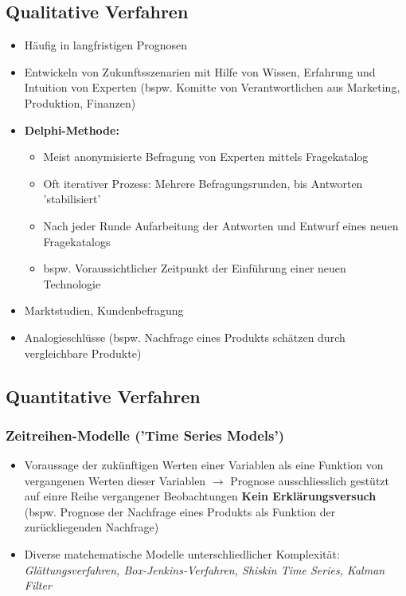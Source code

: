 \documentclass{report}
\theoremstyle{definition}
\theoremstyle{example}
\begin{document}
   \subsection{Qualitative Verfahren}

\begin{itemize}
   \item Häufig in langfristigen Prognosen
   \item Entwickeln von Zukunftsszenarien mit Hilfe von Wissen, Erfahrung und Intuition von Experten (bspw. Komitte von Verantwortlichen aus Marketing, Produktion, Finanzen)
   \item {\textbf{Delphi-Methode:} 
      \begin{itemize}
         \item Meist anonymisierte Befragung von Experten mittels Fragekatalog
         \item Oft iterativer Prozess: Mehrere Befragungsrunden, bis Antworten 'stabilisiert'
         \item Nach jeder Runde Aufarbeitung der Antworten und Entwurf eines neuen Fragekatalogs
         \item bspw. Voraussichtlicher Zeitpunkt der Einführung einer neuen Technologie
      \end{itemize}}
   \item Marktstudien, Kundenbefragung
   \item Analogieschlüsse (bspw. Nachfrage eines Produkts schätzen durch vergleichbare Produkte)
\end{itemize}

   \subsection{Quantitative Verfahren}

      \subsubsection{Zeitreihen-Modelle ('Time Series Models')}
\begin{itemize}
   \item Voraussage der zukünftigen Werten einer Variablen als eine Funktion von vergangenen Werten dieser Variablen $\rightarrow$ Prognose ausschliesslich gestützt auf einre Reihe vergangener Beobachtungen \textbf{Kein Erklärungsversuch} (bspw. Prognose der Nachfrage eines Produkts als Funktion der zurückliegenden Nachfrage)
   \item Diverse matehematische Modelle unterschliedlicher Komplexität: \textit{Glättungsverfahren, Box-Jenkins-Verfahren, Shiskin Time Series, Kalman Filter}
\end{itemize}
\end{document}
